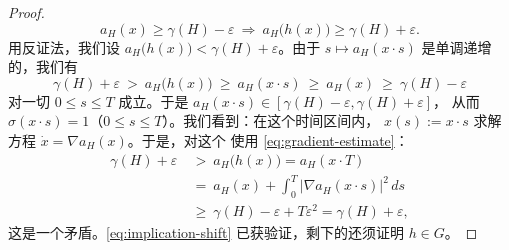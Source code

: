 \begin{proof}
\begin{equation}
a_{H}(x)\geq\gamma(H)-\varepsilon\ \Longrightarrow\ a_{H}\bigl(h(x)\bigr)\geq\gamma(H)+\varepsilon.
\end{equation}
用反证法，我们设 $a_{H}\bigl(h(x)\bigr)<\gamma(H)+\varepsilon$。由于%
$s\mapsto a_{H}(x\cdot s)$ 是单调递增的，我们有
\[
\gamma(H)+\varepsilon\ >\ a_{H}\bigl(h(x)\bigr)\ \geq\ a_{H}(x\cdot s)\ \geq\ a_{H}(x)\ \geq\ \gamma(H)-\varepsilon
\]
对一切 $0\leq s\leq T$ 成立。于是 $a_{H}(x\cdot s)\in[\gamma(H)-\varepsilon,\gamma(H)+\varepsilon]$，%
从而 $\sigma(x\cdot s)=1$（$0\leq s\leq T$）。我们看到：在这个时间区间内，%
$x(s):=x\cdot s$ 求解\trGradient{}方程 $\dot{x}=\nabla a_{H}(x)$。于是，对这个%
\trGradient{}使用\trEstimate{} \eqref{eq:gradient-estimate}：
\begin{align*}
\gamma(H)+\varepsilon\ &>\ a_{H}\bigl(h(x)\bigr)=a_{H}(x\cdot T)\\
&=\ a_{H}(x)+\int_{0}^{T}\bigl\lvert\nabla a_{H}(x\cdot s)\bigr\rvert^{2}\,ds\\
&\geq\ \gamma(H)-\varepsilon+T\varepsilon^{2}=\gamma(H)+\varepsilon,
\end{align*}
这是一个矛盾。\eqref{eq:implication-shift} 已获验证，剩下的还须证明%
$h\in G$。


\end{proof}
